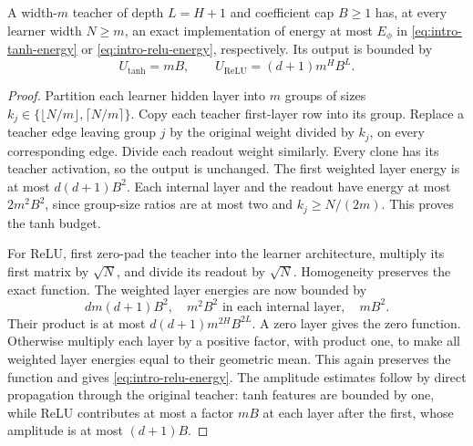 \begin{lemma}
\label{lem:teacher-implementation}
A width-$m$ teacher of depth $L=H+1$ and coefficient cap $B\ge1$ has, at every learner width $N\ge m$, an exact implementation of energy at most $E_\phi$ in \eqref{eq:intro-tanh-energy} or \eqref{eq:intro-relu-energy}, respectively. Its output is bounded by
\begin{equation}
 U_{\tanh}=mB,\qquad U_{\mathrm{ReLU}}=(d+1)m^HB^L.
 \label{eq:teacher-amplitudes}
\end{equation}
\end{lemma}
\begin{proof}
Partition each learner hidden layer into $m$ groups of sizes
$k_j\in\{\lfloor N/m\rfloor,\lceil N/m\rceil\}$. Copy each teacher first-layer row into its group. Replace a teacher edge leaving group $j$ by the original weight divided by $k_j$, on every corresponding edge. Divide each readout weight similarly. Every clone has its teacher activation, so the output is unchanged. The first weighted layer energy is at most $d(d+1)B^2$. Each internal layer and the readout have energy at most $2m^2B^2$, since group-size ratios are at most two and $k_j\ge N/(2m)$. This proves the tanh budget.

For ReLU, first zero-pad the teacher into the learner architecture, multiply its first matrix by $\sqrt N$, and divide its readout by $\sqrt N$. Homogeneity preserves the exact function. The weighted layer energies are now bounded by
\[
 d m(d+1)B^2,\quad m^2B^2\text{ in each internal layer},\quad mB^2.
\]
Their product is at most $d(d+1)m^{2H}B^{2L}$. A zero layer gives the zero function. Otherwise multiply each layer by a positive factor, with product one, to make all weighted layer energies equal to their geometric mean. This again preserves the function and gives \eqref{eq:intro-relu-energy}.
The amplitude estimates follow by direct propagation through the original teacher: tanh features are bounded by one, while ReLU contributes at most a factor $mB$ at each layer after the first, whose amplitude is at most $(d+1)B$.
\end{proof}

